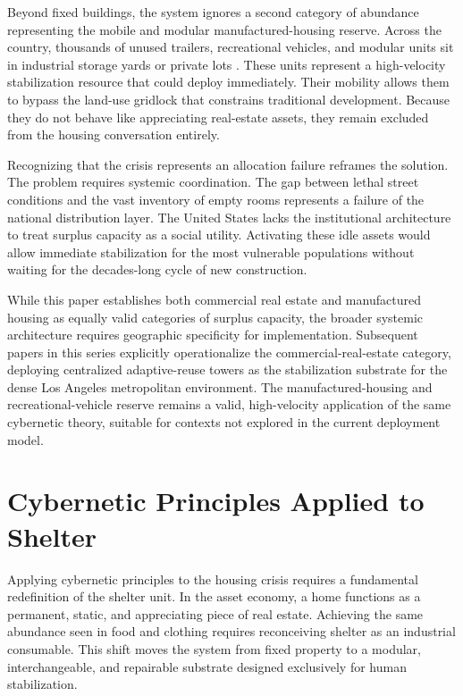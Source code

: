 \documentclass[12pt, letterpaper]{article}
\begin{document}
Beyond fixed buildings, the system ignores a second category of abundance representing the mobile and modular manufactured-housing reserve. Across the country, thousands of unused trailers, recreational vehicles, and modular units sit in industrial storage yards or private lots \citep{hud_manufactured_2024, rvia_2024}. These units represent a high-velocity stabilization resource that could deploy immediately. Their mobility allows them to bypass the land-use gridlock that constrains traditional development. Because they do not behave like appreciating real-estate assets, they remain excluded from the housing conversation entirely.

Recognizing that the crisis represents an allocation failure reframes the solution. The problem requires systemic coordination. The gap between lethal street conditions and the vast inventory of empty rooms represents a failure of the national distribution layer. The United States lacks the institutional architecture to treat surplus capacity as a social utility. Activating these idle assets would allow immediate stabilization for the most vulnerable populations without waiting for the decades-long cycle of new construction.

While this paper establishes both commercial real estate and manufactured housing as equally valid categories of surplus capacity, the broader systemic architecture requires geographic specificity for implementation. Subsequent papers in this series explicitly operationalize the commercial-real-estate category, deploying centralized adaptive-reuse towers as the stabilization substrate for the dense Los Angeles metropolitan environment. The manufactured-housing and recreational-vehicle reserve remains a valid, high-velocity application of the same cybernetic theory, suitable for contexts not explored in the current deployment model.

\section{Cybernetic Principles Applied to Shelter}

Applying cybernetic principles to the housing crisis requires a fundamental redefinition of the shelter unit. In the asset economy, a home functions as a permanent, static, and appreciating piece of real estate. Achieving the same abundance seen in food and clothing requires reconceiving shelter as an industrial consumable. This shift moves the system from fixed property to a modular, interchangeable, and repairable substrate designed exclusively for human stabilization.
\end{document}
